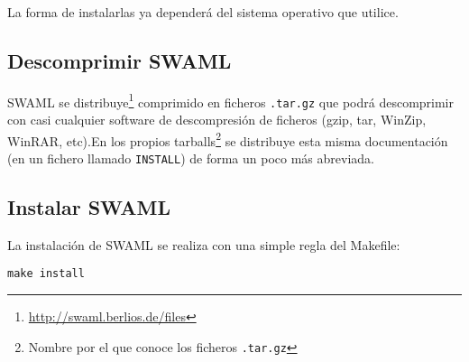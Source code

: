 La forma de instalarlas ya dependerá del sistema operativo que utilice.


\subsection*{Descomprimir SWAML}

SWAML se distribuye\footnote{\url{http://swaml.berlios.de/files}} comprimido
en ficheros \texttt{.tar.gz}  que podrá descomprimir con casi cualquier 
software de descompresión de ficheros (gzip, tar, WinZip, WinRAR, etc).En 
los propios tarballs\footnote{Nombre por el que conoce los ficheros \texttt{.tar.gz}}
se distribuye esta misma documentación (en un fichero llamado \texttt{INSTALL})
de forma un poco más abreviada.

\subsection*{Instalar SWAML}

La instalación de SWAML se realiza con una simple regla del Makefile:

\begin{center}
	\texttt{make install}
\end{center}
